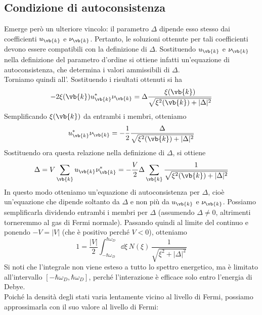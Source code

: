 \subsection{Condizione di autoconsistenza}
Emerge però un ulteriore vincolo: il parametro $\Delta$ dipende esso stesso dai coefficienti $u_{\vb{k}}$ e $\nu_{\vb{k}}$. Pertanto, le soluzioni ottenute per tali coefficienti devono essere compatibili con la definizione di $\Delta$. Sostituendo $u_{\vb{k}}$ e $\nu_{\vb{k}}$ nella definizione del parametro d'ordine si ottiene infatti un'equazione di autoconsistenza, che determina i valori ammissibili di $\Delta$.\\
Torniamo quindi all'. Sostituendo i risultati ottenuti si ha
\begin{equation*}
   -2 \xi(\vb{k}) u^*_{\vb{k}} \nu_{\vb{k}}
   =\Delta \frac{ \xi(\vb{k}) }{ \sqrt{ \xi^2(\vb{k}) + |\Delta|^2 } }
\end{equation*}
Semplificando $\xi(\vb{k})$ da entrambi i membri, otteniamo
\begin{equation}
   u^*_{\vb{k}} \nu_{\vb{k}}
   =- \frac{1}{2} \frac{ \Delta }{ \sqrt{ \xi^2(\vb{k}) + |\Delta|^2 } }
   \label{eq:BCS_u_nu_Delta_relation}
\end{equation}
Sostituendo ora questa relazione nella definizione di $\Delta$, si ottiene
\begin{equation*}
   \Delta
   =V \sum_{\vb{k}} u_{\vb{k}} \nu^*_{\vb{k}}
   =- \frac{V}{2} \Delta \sum_{\vb{k}} \frac{1}{ \sqrt{ \xi^2(\vb{k}) + |\Delta|^2 } }
\end{equation*}
In questo modo otteniamo un'equazione di autoconsistenza per $\Delta$, cioè un'equazione che dipende soltanto da $\Delta$ e non più da $u_{\vb{k}}$ e $\nu_{\vb{k}}$. Possiamo semplificarla dividendo entrambi i membri per $\Delta$ (assumendo $\Delta \neq 0$, altrimenti torneremmo al gas di Fermi normale). Passando quindi al limite del continuo e ponendo $-V=|V|$ (che è positivo perché $V<0$), otteniamo
\begin{equation*}
   1
   =\frac{|V|}{2} \int_{-\hbar\omega_D}^{\hbar\omega_D} \dd{\xi}\, N(\xi)\, \frac{1}{ \sqrt{ \xi^2 + |\Delta|^2 } }
\end{equation*}
Si noti che l'integrale non viene esteso a tutto lo spettro energetico, ma è limitato all'intervallo $[-\hbar\omega_D, \hbar\omega_D]$, perché l'interazione è efficace solo entro l'energia di Debye.\\
Poiché la densità degli stati varia lentamente vicino al livello di Fermi, possiamo approssimarla con il suo valore al livello di Fermi:
